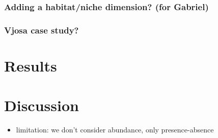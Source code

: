 \documentclass[11pt,a4paper]{article}
\begin{document}
\subsubsection{Adding a habitat/niche dimension? (for Gabriel)}

\subsubsection{Vjosa case study?}

\section{Results}

\section{Discussion}

\begin{itemize}
	\item limitation: we don't consider abundance, only presence-absence
\end{itemize}

\printbibliography
\end{document}

